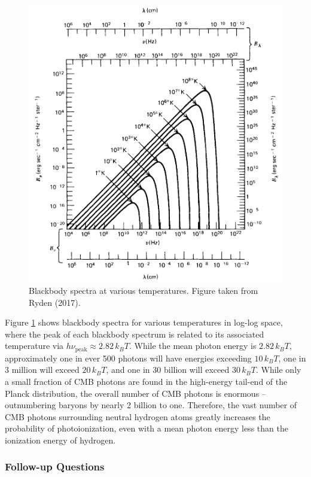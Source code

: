 \documentclass[a4paper,11pt]{article}
\begin{document}
\begin{figure}[h]
    \includegraphics[width=12cm]{figures/blackbody.png}
    \centering
    \caption{Blackbody spectra at various temperatures. Figure taken from Ryden (2017).}
    \label{fig:blackbody}
\end{figure}

{\noindent}Figure \ref{fig:blackbody} shows blackbody spectra for various temperatures in log-log space, where the peak of each blackbody spectrum is related to its associated temperature via $h\nu_\mathrm{peak} \approx 2.82\,k_BT$. While the mean photon energy is $2.82\,k_BT$, approximately one in ever 500 photons will have energies exceeding $10\,k_BT$, one in 3 million will exceed $20\,k_BT$, and one in 30 billion will exceed $30\,k_BT$. While only a small fraction of CMB photons are found in the high-energy tail-end of the Planck distribution, the overall number of CMB photons is enormous -- outnumbering baryons by nearly 2 billion to one. Therefore, the vast number of CMB photons surrounding neutral hydrogen atoms greatly increases the probability of photoionization, even with a mean photon energy less than the ionization energy of hydrogen.

\subsubsection{Follow-up Questions}
\end{document}
